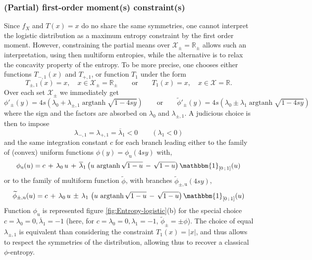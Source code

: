 \documentclass[english,sort&compress]{elsarticle}
\theoremstyle{definition}
\theoremstyle{plain}
\theoremstyle{plain}
\def\Rset{\mathbb{R}}
\def\X{\mathcal{X}}
\def\un{\mathbbm{1}}
\def\argtanh{\operatorname{argtanh}}
\begin{document}

\subsubsection{(Partial) first-order moment(s) constraint(s)}

Since $f_X$ and $T(x) = x$ do no share the same symmetries, one cannot interpret
the logistic  distribution as  a maximum entropy  constraint by the  first order
moment. However,  constraining the partial  means over $\X_\pm  = \Rset_\pm$
allows  such  an  interpretation,  using  then multiform  entropies,  while  the
alternative  is to  relax the  concavity  property of  the entropy.  To be  more
precise, one  chooses either functions $T_{-,1}(x)$ and  $T_{+,1}$, or function
$T_1$ under the form
%
\[
T_{\pm,1}(x) = x, \quad x \in  \X_\pm = \Rset_\pm \qquad \mbox{or} \qquad T_1(x)
= x,\quad x \in \X = \Rset.
\]
%
Over each set $\X_\pm$ we immediately get 
%
\[
\phi'_\pm(y)  = 4  s \left(  \lambda_0 +  \lambda_{\pm,1} \argtanh\sqrt{1-4sy}
\right)  \qquad  \mbox{or}  \qquad   \widetilde{\phi}'_\pm(y)  =  4  s  \left(
  \lambda_0 \pm \lambda_1 \argtanh\sqrt{1-4sy} \right)
\]
%
where   the   sign  and   the   factors   are   absorbed  on   $\lambda_0$   and
$\lambda_{\pm,1}$. A judicious choice is then to impose
%
\[
\lambda_{-,1} = \lambda_{+,1} = \overline{\lambda}_1 < 0 \qquad (\lambda_1 < 0)
\]
%
and the  same integration constant  $c$ for each  branch leading either  to the
family of (convex) uniform functions $\phi(y) = \phi_{\mathrm{u}}(4 s y)$ with,
%
\[
\phi_{\mathrm{u}}(u) =  c \, +  \, \lambda_0 \,  u \, +  \, \overline{\lambda}_1
\left( u \, \argtanh\sqrt{1-u} \, -  \, \sqrt{1-u} \right) \un_{\left[ 0 \, ; \,
    1 \right]}(u)
\]
%
or  to  the  family  of  multiform function  $\widetilde{\phi}$,  with  branches
$\widetilde{\phi}_{\pm,\mathrm{u}}(4 s y)$,
%
\[
\widetilde{\phi}_{\pm,\mathrm{u}}(u)  = c  \,  + \,  \lambda_0  \, u  \, \pm  \,
\lambda_1  \,  \left(  u  \,  \argtanh\sqrt{1-u}  \,  -  \,  \sqrt{1-u}  \right)
\un_{\left[ 0 \, ; \, 1 \right]}(u)
\]
%
Function $\phi_{\mathrm{u}}$ is represented figure \ref{fig:Entropy-logistic}(b)
for the special choice $c = \lambda_0 = 0, \overline{\lambda}_1 = -1$ (here, for
$c =  \lambda_0 = 0, \lambda_1  = -1$, $\widetilde{\phi}_\pm =  \pm \phi$).  The
choice of equal $\lambda_{\pm,1}$  is equivalent than considering the constraint
$T_1(x) = |x|$,  and thus allows to respect the  symmetries of the distribution,
allowing thus to recover a classical $\phi$-entropy.
\end{document}
